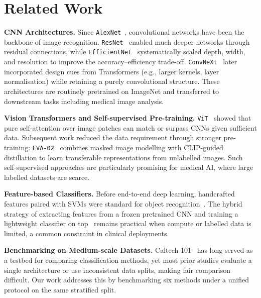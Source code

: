\section{Related Work}

\textbf{CNN Architectures.} Since \texttt{AlexNet}~\citep{krizhevsky2012imagenet}, convolutional networks have been the backbone of image recognition. \texttt{ResNet}~\citep{he2016deep} enabled much deeper networks through residual connections, while \texttt{EfficientNet}~\citep{tan2019efficientnet} systematically scaled depth, width, and resolution to improve the accuracy--efficiency trade-off. \texttt{ConvNeXt}~\citep{liu2022convnet} later incorporated design cues from Transformers (e.g., larger kernels, layer normalisation) while retaining a purely convolutional structure. These architectures are routinely pretrained on ImageNet and transferred to downstream tasks including medical image analysis.

\textbf{Vision Transformers and Self-supervised Pre-training.} \texttt{ViT}~\citep{dosovitskiy2020image} showed that pure self-attention over image patches can match or surpass CNNs given sufficient data. Subsequent work reduced the data requirement through stronger pre-training: \texttt{EVA-02}~\citep{fang2024eva} combines masked image modelling with CLIP-guided distillation to learn transferable representations from unlabelled images. Such self-supervised approaches are particularly promising for medical AI, where large labelled datasets are scarce.

\textbf{Feature-based Classifiers.} Before end-to-end deep learning, handcrafted features paired with SVMs were standard for object recognition~\citep{fei2004learning}. The hybrid strategy of extracting features from a frozen pretrained CNN and training a lightweight classifier on top~\citep{donahue2014decaf} remains practical when compute or labelled data is limited, a common constraint in clinical deployments.

\textbf{Benchmarking on Medium-scale Datasets.} Caltech-101~\citep{fei2004learning} has long served as a testbed for comparing classification methods, yet most prior studies evaluate a single architecture or use inconsistent data splits, making fair comparison difficult. Our work addresses this by benchmarking six methods under a unified protocol on the same stratified split.